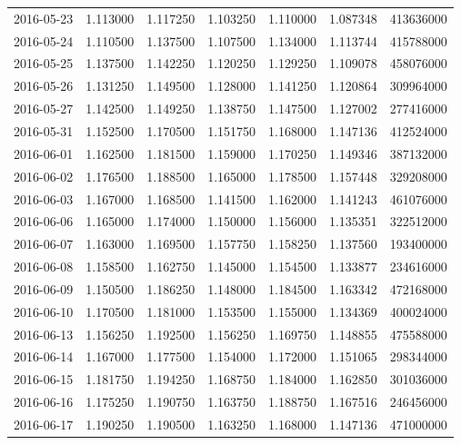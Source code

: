 \begin{tabular}{lrrrrrr}
2016-05-23 &    1.113000 &    1.117250 &    1.103250 &    1.110000 &    1.087348 &   413636000 \\
2016-05-24 &    1.110500 &    1.137500 &    1.107500 &    1.134000 &    1.113744 &   415788000 \\
2016-05-25 &    1.137500 &    1.142250 &    1.120250 &    1.129250 &    1.109078 &   458076000 \\
2016-05-26 &    1.131250 &    1.149500 &    1.128000 &    1.141250 &    1.120864 &   309964000 \\
2016-05-27 &    1.142500 &    1.149250 &    1.138750 &    1.147500 &    1.127002 &   277416000 \\
2016-05-31 &    1.152500 &    1.170500 &    1.151750 &    1.168000 &    1.147136 &   412524000 \\
2016-06-01 &    1.162500 &    1.181500 &    1.159000 &    1.170250 &    1.149346 &   387132000 \\
2016-06-02 &    1.176500 &    1.188500 &    1.165000 &    1.178500 &    1.157448 &   329208000 \\
2016-06-03 &    1.167000 &    1.168500 &    1.141500 &    1.162000 &    1.141243 &   461076000 \\
2016-06-06 &    1.165000 &    1.174000 &    1.150000 &    1.156000 &    1.135351 &   322512000 \\
2016-06-07 &    1.163000 &    1.169500 &    1.157750 &    1.158250 &    1.137560 &   193400000 \\
2016-06-08 &    1.158500 &    1.162750 &    1.145000 &    1.154500 &    1.133877 &   234616000 \\
2016-06-09 &    1.150500 &    1.186250 &    1.148000 &    1.184500 &    1.163342 &   472168000 \\
2016-06-10 &    1.170500 &    1.181000 &    1.153500 &    1.155000 &    1.134369 &   400024000 \\
2016-06-13 &    1.156250 &    1.192500 &    1.156250 &    1.169750 &    1.148855 &   475588000 \\
2016-06-14 &    1.167000 &    1.177500 &    1.154000 &    1.172000 &    1.151065 &   298344000 \\
2016-06-15 &    1.181750 &    1.194250 &    1.168750 &    1.184000 &    1.162850 &   301036000 \\
2016-06-16 &    1.175250 &    1.190750 &    1.163750 &    1.188750 &    1.167516 &   246456000 \\
2016-06-17 &    1.190250 &    1.190500 &    1.163250 &    1.168000 &    1.147136 &   471000000 \\

\end{tabular}
